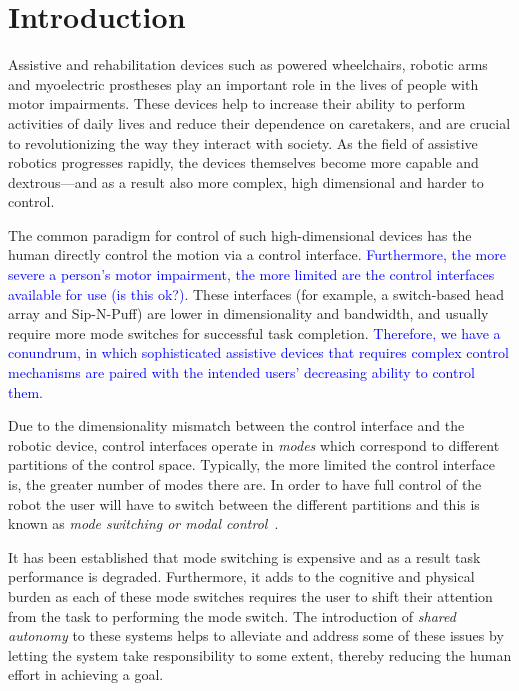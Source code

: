\documentclass[conference]{IEEEtran}
\begin{document}
\IEEEpeerreviewmaketitle

\section{Introduction}

Assistive and rehabilitation devices such as powered wheelchairs, robotic arms and myoelectric prostheses play an important role in the lives of people with motor impairments. These devices help to increase their ability to perform activities of daily lives and reduce their dependence on caretakers, and are crucial to revolutionizing the way they interact with society. As the field of assistive robotics progresses rapidly, the devices themselves become more capable and dextrous---and as a result also more complex, high dimensional and harder to control. 

The common paradigm for control of such high-dimensional devices has the human directly control the motion via a control interface. \textcolor{blue}{Furthermore, the more severe a person's motor impairment, the more limited are the control interfaces available for use (is this ok?)}. These interfaces (for example, a switch-based head array and Sip-N-Puff) are lower in dimensionality and bandwidth, and usually require more mode switches for successful task completion. \textcolor{blue}{Therefore, we have a conundrum, in which sophisticated assistive devices that requires complex control mechanisms are paired with the intended users' decreasing ability to control them.}

Due to the dimensionality mismatch between the control interface and the robotic device, control interfaces operate in \textit{modes} which correspond to different partitions of the control space. Typically, the more limited the control interface is, the greater number of modes there are. In order to have full control of the robot the user will have to switch between the different partitions and this is known as \textit{mode switching or modal control}~\cite{tsui2008development, nuttin2002selection}. 

It has been established that mode switching is expensive and as a result task performance is degraded. Furthermore, it adds to the cognitive and physical burden as each of these mode switches requires the user to shift their attention from the task to performing the mode switch. The introduction of \textit{shared autonomy} to these systems helps to alleviate and address some of these issues by letting the system take responsibility to some extent, thereby reducing the human effort in achieving a goal. 
\end{document}
